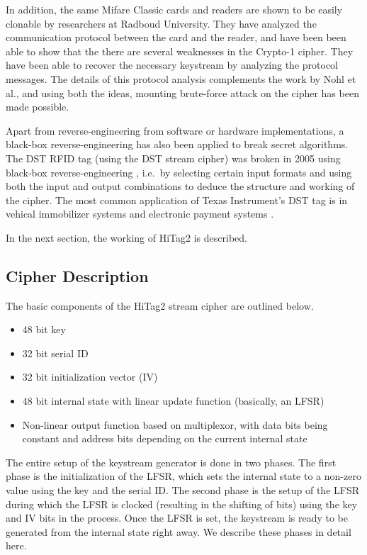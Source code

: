 In addition, the same Mifare Classic cards and readers are shown to be easily clonable \cite{dekoninggans2008pam} by researchers at Radboud University. They have analyzed the communication protocol between the card and the reader, and have been been able to show that the there are several weaknesses in the Crypto-1 cipher. They have been able to recover the necessary keystream by analyzing the protocol messages. The details of this protocol analysis complements the work by Nohl et al., and using both the ideas, mounting brute-force attack on the cipher has been made possible. 

Apart from reverse-engineering from software or hardware implementations, a black-box reverse-engineering has also been applied to break secret algorithms. The DST RFID tag (using the DST stream cipher) was broken in 2005 using black-box reverse-engineering \cite{bono2005sac}, i.e.~by selecting certain input formats and using both the input and output combinations to deduce the structure and working of the cipher. The most common application of Texas Instrument's DST tag is in vehical immobilizer systems and electronic payment systems \cite{dst-rfid-analysis}. 

In the next section, the working of HiTag2 is described.

\subsection{Cipher Description}
The basic components of the HiTag2 stream cipher are outlined below.
\begin{itemize}
\item 48 bit key
\item 32 bit serial ID
\item 32 bit initialization vector (IV)
\item 48 bit internal state with linear update function (basically, an LFSR)
\item Non-linear output function based on multiplexor, with data bits being constant and address bits depending on the current internal state
\end{itemize}

The entire setup of the keystream generator is done in two phases. The first phase is the initialization of the LFSR, which sets the internal state to a non-zero value using the key and the serial ID. The second phase is the setup of the LFSR during which the LFSR is clocked (resulting in the shifting of bits) using the key and IV bits in the process. Once the LFSR is set, the keystream is ready to be generated from the internal state right away. We describe these phases in detail here.\\ 

